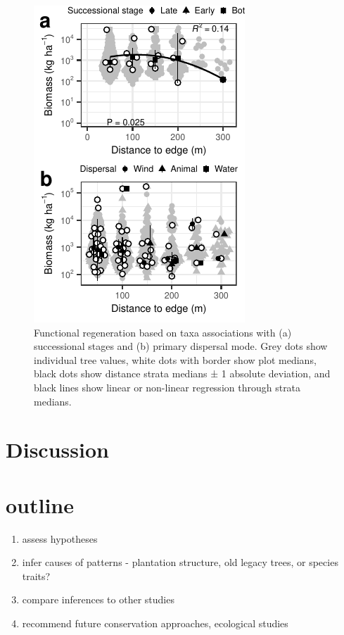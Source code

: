 \documentclass[
  12pt,
]{article}
\providecommand{\tightlist}{%
  \setlength{\itemsep}{0pt}\setlength{\parskip}{0pt}}
\begin{document}
\begin{figure}
\centering
\includegraphics{merge_files/figure-latex/traits-1.pdf}
\caption{\label{fig:traits} Functional regeneration based on taxa associations with (a) successional stages and (b) primary dispersal mode. Grey dots show individual tree values, white dots with border show plot medians, black dots show distance strata medians ± 1 absolute deviation, and black lines show linear or non-linear regression through strata medians.}
\end{figure}

\hypertarget{discussion}{%
\section{Discussion}\label{discussion}}

\hypertarget{outline}{%
\section*{outline}\label{outline}}

\begin{enumerate}
\def\labelenumi{\arabic{enumi}.}
\tightlist
\item
  assess hypotheses
\item
  infer causes of patterns - plantation structure, old legacy trees, or species traits?
\item
  compare inferences to other studies
\item
  recommend future conservation approaches, ecological studies
\end{enumerate}
\end{document}
